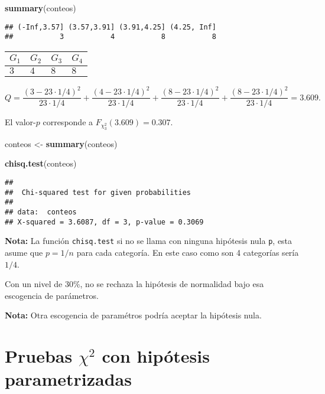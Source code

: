 \documentclass[
  12pt,
]{book}
\newenvironment{Shaded}{\begin{snugshade}}{\end{snugshade}}
\newcommand{\KeywordTok}[1]{\textcolor[rgb]{0.13,0.29,0.53}{\textbf{#1}}}
\newcommand{\NormalTok}[1]{#1}
\newcommand{\StringTok}[1]{\textcolor[rgb]{0.31,0.60,0.02}{#1}}
\begin{document}
\begin{Shaded}
\begin{Highlighting}[]
\KeywordTok{summary}\NormalTok{(conteos)}
\end{Highlighting}
\end{Shaded}

\begin{verbatim}
## (-Inf,3.57] (3.57,3.91] (3.91,4.25] (4.25, Inf] 
##           3           4           8           8
\end{verbatim}

\begin{longtable}[]{@{}llll@{}}
\toprule
\(G_1\) & \(G_2\) & \(G_3\) & \(G_4\)\tabularnewline
\midrule
\endhead
\(3\) & \(4\) & \(8\) & \(8\)\tabularnewline
\bottomrule
\end{longtable}

\[Q = \dfrac{(3-23\cdot1/4)^2}{23\cdot 1/4} +  \dfrac{(4-23\cdot1/4)^2}{23\cdot 1/4}+\dfrac{(8-23\cdot1/4)^2}{23\cdot 1/4} + \dfrac{(8-23\cdot1/4)^2}{23\cdot 1/4}= 3.609.\]

El valor-\(p\) corresponde a \(F_{\chi^2_3}(3.609) = 0.307\).

\begin{Shaded}
\begin{Highlighting}[]
\NormalTok{conteos \textless{}{-}}\StringTok{ }\KeywordTok{summary}\NormalTok{(conteos)}

\KeywordTok{chisq.test}\NormalTok{(conteos)}
\end{Highlighting}
\end{Shaded}

\begin{verbatim}
## 
##  Chi-squared test for given probabilities
## 
## data:  conteos
## X-squared = 3.6087, df = 3, p-value = 0.3069
\end{verbatim}

\textbf{Nota:} La función \texttt{chisq.test} si no se llama con ninguna hipótesis nula \texttt{p},
esta asume que \(p = 1/n\) para cada categoría. En este caso como son 4
categorías sería \(1/4\).

Con un nivel de 30\%, no se rechaza la hipótesis de normalidad bajo esa escogencia
de parámetros.

\textbf{Nota:} Otra escogencia de paramétros podría aceptar la hipótesis nula.

\hypertarget{pruebas-chi2-con-hipuxf3tesis-parametrizadas}{%
\section{\texorpdfstring{Pruebas \(\chi^2\) con hipótesis parametrizadas}{Pruebas \textbackslash chi\^{}2 con hipótesis parametrizadas}}\label{pruebas-chi2-con-hipuxf3tesis-parametrizadas}}
\end{document}
